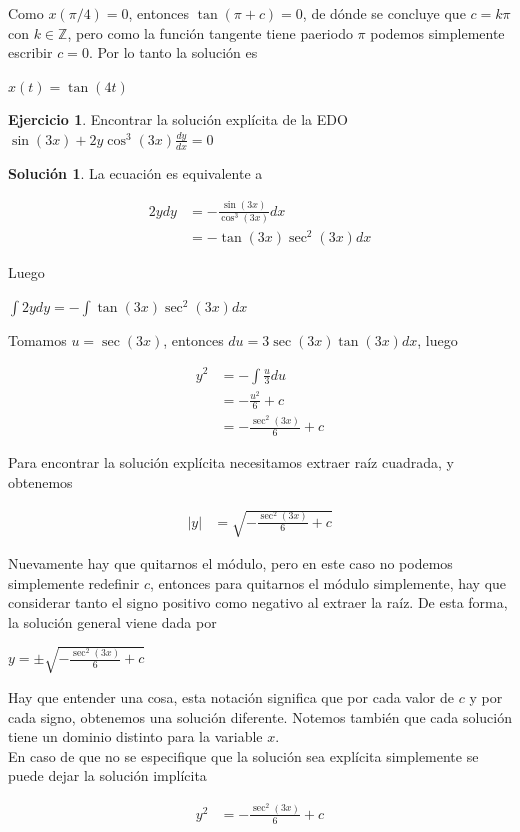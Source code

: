 \documentclass{article}
\theoremstyle{plain}
\theoremstyle{definition}
\newtheorem{ejer}[thm]{Ejercicio}
\newtheorem{sol}[thm]{Solución}
\begin{document}
Como $x(\pi/4)=0$, entonces $\tan(\pi+c)=0$, de dónde se concluye que $c = k \pi$ con $k \in \mathbb{Z}$, pero como la función tangente tiene paeriodo $\pi$ podemos simplemente escribir $c=0$. Por lo tanto la solución es

\begin{center}
$x(t)= \tan(4t)$
\end{center}


\begin{ejer}Encontrar la solución explícita de la EDO $\displaystyle \sin(3x) +2y\cos^3(3x)\frac{dy}{dx}=0$\\
\end{ejer}

\begin{sol}La ecuación es equivalente a
\end{sol}

\begin{align*}
\displaystyle 2ydy &=-\frac{\sin(3x)}{\cos^3(3x)}dx \\
&=-\tan(3x)\sec^2(3x)dx
\end{align*}

Luego

\begin{center}
$\displaystyle \int 2y dy = -\int \tan(3x)\sec^2(3x)dx$
\end{center}

Tomamos $u= \sec(3x)$, entonces $du= 3\sec(3x)\tan(3x)dx$, luego

\begin{align*}
\displaystyle y^2 &= -\int \frac{u}{3} du \\
&= -\frac{u^2}{6} +c \\
&= -\frac{\sec^2(3x)}{6} +c
\end{align*}

Para encontrar la solución explícita necesitamos extraer raíz cuadrada, y obtenemos


\begin{align*}
\displaystyle |y|&= \sqrt{-\frac{\sec^2(3x)}{6} +c }
\end{align*}


Nuevamente hay que quitarnos el módulo, pero en este caso no podemos simplemente redefinir $c$, entonces para quitarnos el módulo simplemente, hay que considerar tanto el signo positivo como negativo al extraer la raíz. De esta forma, la solución general viene dada por


\begin{center}
$y = \pm\displaystyle \sqrt{-\frac{\sec^2(3x)}{6} +c} $
\end{center}
Hay que entender una cosa, esta notación significa que por cada valor de $c$  y por cada signo, obtenemos una solución diferente. Notemos también que cada solución tiene un dominio distinto para la variable $x$.\\


En caso de que no se especifique que la solución sea explícita simplemente se puede dejar la solución implícita


\begin{align*}
\displaystyle y^2 &= -\frac{\sec^2(3x)}{6} +c \\
\end{align*}
\end{document}
